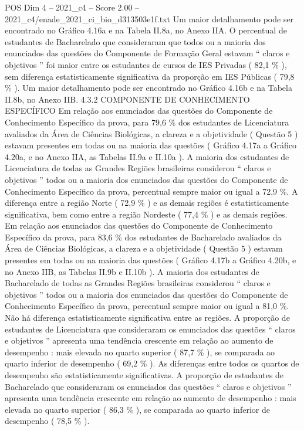 \begin{textsample}{POS Dim 4 – 2021\_c4 – Score 2.00 – 2021\_c4/enade\_2021\_ci\_bio\_d313503e1f.txt}
Um maior detalhamento pode ser encontrado no Gráfico 4.16a e na Tabela II.8a, no Anexo IIA.
O percentual de estudantes de Bacharelado que consideraram que todos ou a maioria dos enunciados das questões do Componente de Formação Geral estavam “ claros e objetivos ” foi maior entre os estudantes de cursos de IES Privadas ( 82,1 \% ), sem diferença estatisticamente significativa da proporção em IES Públicas ( 79,8 \% ).
Um maior detalhamento pode ser encontrado no Gráfico 4.16b e na Tabela II.8b, no Anexo IIB. 4.3.2 COMPONENTE DE CONHECIMENTO ESPECÍFICO Em relação aos enunciados das questões do Componente de Conhecimento Específico da prova, para 79,6 \% dos estudantes de Licenciatura avaliados da Área de Ciências Biológicas, a clareza e a objetividade ( Questão 5 ) estavam presentes em todas ou na maioria das questões ( Gráfico 4.17a a Gráfico 4.20a, e no Anexo IIA, as Tabelas II.9a e II.10a ).
A maioria dos estudantes de Licenciatura de todas as Grandes Regiões brasileiras considerou “ claros e objetivos ” todos ou a maioria dos enunciados das questões do Componente de Conhecimento Específico da prova, percentual sempre maior ou igual a 72,9 \%.
A diferença entre a região Norte ( 72,9 \% ) e as demais regiões é estatisticamente significativa, bem como entre a região Nordeste ( 77,4 \% ) e as demais regiões.
Em relação aos enunciados das questões do Componente de Conhecimento Específico da prova, para 83,6 \% dos estudantes de Bacharelado avaliados da Área de Ciências Biológicas, a clareza e a objetividade ( Questão 5 ) estavam presentes em todas ou na maioria das questões ( Gráfico 4.17b a Gráfico 4.20b, e no Anexo IIB, as Tabelas II.9b e II.10b ).
A maioria dos estudantes de Bacharelado de todas as Grandes Regiões brasileiras considerou “ claros e objetivos ” todos ou a maioria dos enunciados das questões do Componente de Conhecimento Específico da prova, percentual sempre maior ou igual a 81,0 \%.
Não há diferença estatisticamente significativa entre as regiões.
A proporção de estudantes de Licenciatura que consideraram os enunciados das questões “ claros e objetivos ” apresenta uma tendência crescente em relação ao aumento de desempenho : mais elevada no quarto superior ( 87,7 \% ), se comparada ao quarto inferior de desempenho ( 69,2 \% ).
As diferenças entre todos os quartos de desempenho são estatisticamente significativas.
A proporção de estudantes de Bacharelado que consideraram os enunciados das questões “ claros e objetivos ” apresenta uma tendência crescente em relação ao aumento de desempenho : mais elevada no quarto superior ( 86,3 \% ), se comparada ao quarto inferior de desempenho ( 78,5 \% ).

\end{textsample}
